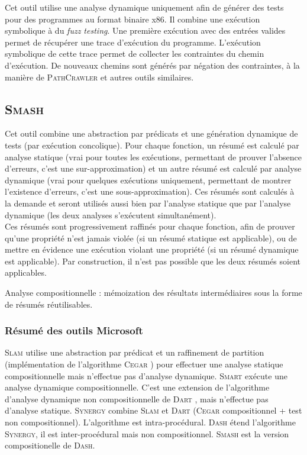 Cet outil \cite{SAGE} utilise une analyse dynamique uniquement afin de générer
des tests pour des programmes au format binaire x86. Il combine une exécution
symbolique à du {\em fuzz testing}. Une première exécution avec des entrées
valides permet de récupérer une trace d'exécution du programme. L'exécution
symbolique de cette trace permet de collecter les contraintes du chemin
d'exécution. De nouveaux chemins sont générés par négation des contraintes,
à la manière de \textsc{PathCrawler} \cite{PathCrawler} et autres outils
similaires.

\subsection{\textsc{Smash}}

Cet outil \cite{SMASH} combine une abstraction par prédicats et une génération
dynamique de tests (par exécution concolique). Pour chaque fonction, un résumé
est calculé par analyse statique (vrai pour toutes les exécutions, permettant
de prouver l'absence d'erreurs, c'est une sur-approximation) et un autre résumé
est calculé par analyse dynamique (vrai pour quelques exécutions uniquement,
permettant de montrer l'existence d'erreurs, c'est une sous-approximation). Ces
résumés sont calculés à la demande et seront utilisés aussi bien par l'analyse
statique que par l'analyse dynamique (les deux analyses s'exécutent
simultanément).\\

Ces résumés sont progressivement raffinés pour chaque fonction, afin de prouver
qu'une propriété n'est jamais violée (si un résumé statique est applicable), ou
de mettre en évidence une exécution violant une propriété (si un résumé
dynamique est applicable). Par construction, il n'est pas
possible que les deux résumés soient applicables.\\


\begin{definition}
Analyse compositionnelle : mémoization des résultats intermédiaires sous la
forme de résumés réutilisables.
\end{definition}


\subsubsection{Résumé des outils Microsoft}


\textsc{Slam} \cite{SLAM} utilise une abstraction par prédicat et un raffinement
de partition (implémentation de l'algorithme \textsc{Cegar} \cite{CEGAR}) pour
effectuer une analyse statique compositionnelle mais n'effectue pas d'analyse
dynamique. \textsc{Smart} \cite{SMART} exécute une analyse dynamique
compositionnelle. C'est une extension de l'algorithme d'analyse dynamique non
compositionnelle de \textsc{Dart} \cite{DART}, mais n'effectue pas d'analyse
statique. \textsc{Synergy} \cite{SYNERGY} combine \textsc{Slam} \cite{SLAM} et
\textsc{Dart} \cite{DART} (\textsc{Cegar} compositionnel + test non
compositionnel). L'algorithme est intra-procédural. \textsc{Dash} \cite{DASH}
étend l'algorithme \textsc{Synergy}, il est inter-procédural mais non
compositionnel. \textsc{Smash} \cite{SMASH} est la version compositionelle de
\textsc{Dash}.



